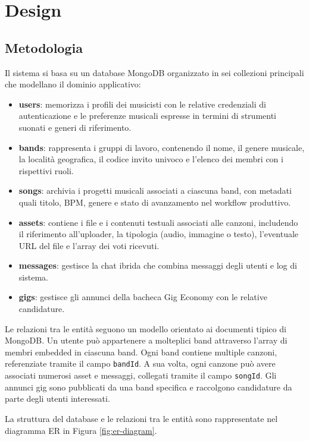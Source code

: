 \documentclass{report}
\begin{document}
\chapter{Design}

\section{Metodologia}

Il sistema si basa su un database MongoDB organizzato in sei collezioni principali che modellano il dominio applicativo:
\begin{itemize}
    \item \textbf{users}: memorizza i profili dei musicisti con le relative credenziali di autenticazione e le preferenze musicali espresse in termini di strumenti suonati e generi di riferimento.
    \item \textbf{bands}: rappresenta i gruppi di lavoro, contenendo il nome, il genere musicale, la località geografica, il codice invito univoco e l'elenco dei membri con i rispettivi ruoli.
    \item \textbf{songs}: archivia i progetti musicali associati a ciascuna band, con metadati quali titolo, BPM, genere e stato di avanzamento nel workflow produttivo.
    \item \textbf{assets}: contiene i file e i contenuti testuali associati alle canzoni, includendo il riferimento all'uploader, la tipologia (audio, immagine o testo), l'eventuale URL del file e l'array dei voti ricevuti.
    \item \textbf{messages}: gestisce la chat ibrida che combina messaggi degli utenti e log di sistema.
    \item \textbf{gigs}: gestisce gli annunci della bacheca Gig Economy con le relative candidature.
\end{itemize}

Le relazioni tra le entità seguono un modello orientato ai documenti tipico di MongoDB. Un utente può appartenere a molteplici band attraverso l'array di membri embedded in ciascuna band. Ogni band contiene multiple canzoni, referenziate tramite il campo \texttt{bandId}. A sua volta, ogni canzone può avere associati numerosi asset e messaggi, collegati tramite il campo \texttt{songId}. Gli annunci gig sono pubblicati da una band specifica e raccolgono candidature da parte degli utenti interessati.

La struttura del database e le relazioni tra le entità sono rappresentate nel diagramma ER in Figura \ref{fig:er-diagram}.
\end{document}

